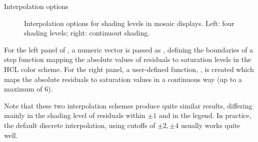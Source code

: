 \documentclass[11pt]{book}\usepackage[]{graphicx}\usepackage[]{color}
\newenvironment{knitrout}{}{} %
\renewenvironment{knitrout}{\small\renewcommand{\baselinestretch}{.85}}{} %
\begin{document}
\begin{Example}[interp]{Interpolation options}
\begin{knitrout}
\begin{figure}[htbp]
\caption[Interpolation options for shading levels in mosaic displays]{Interpolation options for shading levels in mosaic displays. Left: four shading levels; right: continuout shading.\label{fig:HE-interp}}
\end{figure}


\end{knitrout}

For the left panel of , a numeric vector is passed as , defining the
boundaries of a step function mapping the absolute values of residuals to
saturation levels in the HCL color scheme.
For the right panel, a user-defined function, , is created which maps
the absolute residuals to saturation values in a continuous way (up to a maximum of 6).

Note that these two interpolation schemes produce quite similar results, differing
mainly in the shading level of residuals within $\pm 1$ and in the legend.  
In practice, the default discrete interpolation, using cutoffs of $\pm 2, \pm 4$
usually works quite well.  
\end{Example}
\end{document}
